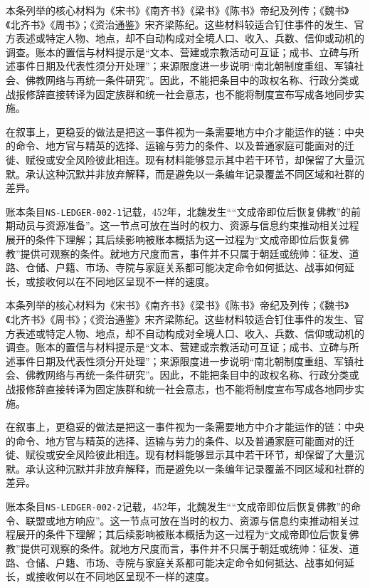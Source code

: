 本条列举的核心材料为《宋书》《南齐书》《梁书》《陈书》帝纪及列传；《魏书》《北齐书》《周书》；《资治通鉴》宋齐梁陈纪。这些材料较适合钉住事件的发生、官方表述或特定人物、地点，却不自动构成对全境人口、收入、兵数、信仰或动机的调查。账本的置信与材料提示是“文本、营建或宗教活动可互证；成书、立碑与所述事件日期及代表性须分开处理”；来源限度进一步说明“南北朝制度重组、军镇社会、佛教网络与再统一条件研究”。因此，不能把条目中的政权名称、行政分类或战报修辞直接转译为固定族群和统一社会意志，也不能将制度宣布写成各地同步实施。

在叙事上，更稳妥的做法是把这一事件视为一条需要地方中介才能运作的链：中央的命令、地方官与精英的选择、运输与劳力的条件、以及普通家庭可能面对的迁徙、赋役或安全风险彼此相连。现有材料能够显示其中若干环节，却保留了大量沉默。承认这种沉默并非放弃解释，而是避免以一条编年记录覆盖不同区域和社群的差异。

账本条目\texttt{NS-LEDGER-002-1}记载，452年，北魏发生““文成帝即位后恢复佛教”的前期动员与资源准备”。这一节点可放在当时的权力、资源与信息约束推动相关过程展开的条件下理解；其后续影响被账本概括为这一过程为“文成帝即位后恢复佛教”提供可观察的条件。就地方尺度而言，事件并不只属于朝廷或统帅：征发、道路、仓储、户籍、市场、寺院与家庭关系都可能决定命令如何抵达、战事如何延长，或接收何以在不同地区呈现不一样的速度。

本条列举的核心材料为《宋书》《南齐书》《梁书》《陈书》帝纪及列传；《魏书》《北齐书》《周书》；《资治通鉴》宋齐梁陈纪。这些材料较适合钉住事件的发生、官方表述或特定人物、地点，却不自动构成对全境人口、收入、兵数、信仰或动机的调查。账本的置信与材料提示是“文本、营建或宗教活动可互证；成书、立碑与所述事件日期及代表性须分开处理”；来源限度进一步说明“南北朝制度重组、军镇社会、佛教网络与再统一条件研究”。因此，不能把条目中的政权名称、行政分类或战报修辞直接转译为固定族群和统一社会意志，也不能将制度宣布写成各地同步实施。

在叙事上，更稳妥的做法是把这一事件视为一条需要地方中介才能运作的链：中央的命令、地方官与精英的选择、运输与劳力的条件、以及普通家庭可能面对的迁徙、赋役或安全风险彼此相连。现有材料能够显示其中若干环节，却保留了大量沉默。承认这种沉默并非放弃解释，而是避免以一条编年记录覆盖不同区域和社群的差异。

账本条目\texttt{NS-LEDGER-002-2}记载，452年，北魏发生““文成帝即位后恢复佛教”的命令、联盟或地方响应”。这一节点可放在当时的权力、资源与信息约束推动相关过程展开的条件下理解；其后续影响被账本概括为这一过程为“文成帝即位后恢复佛教”提供可观察的条件。就地方尺度而言，事件并不只属于朝廷或统帅：征发、道路、仓储、户籍、市场、寺院与家庭关系都可能决定命令如何抵达、战事如何延长，或接收何以在不同地区呈现不一样的速度。

